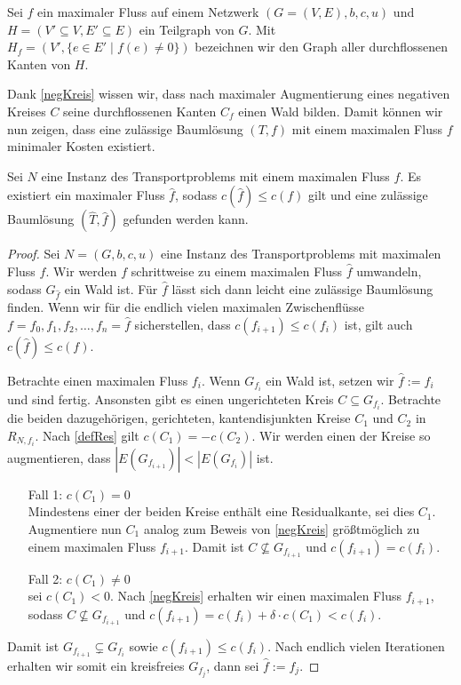 \begin{nota}Sei $f$ ein maximaler Fluss auf einem Netzwerk $(G=(V,E),b,c,u)$ und $H=(V'\subseteq V, E'\subseteq E)$ ein Teilgraph von $G$. Mit $H_f=(V',\{e\in E' \mid f(e) \neq 0\})$ bezeichnen wir den Graph aller durchflossenen Kanten von $H$.\end{nota}

Dank \cref{negKreis} wissen wir, dass nach maximaler Augmentierung eines negativen Kreises $C$ seine durchflossenen Kanten $C_f$ einen Wald bilden. Damit können wir nun zeigen, dass eine zulässige Baumlösung $(T,f)$ mit einem maximalen Fluss $f$ minimaler Kosten existiert.

\begin{thm}\label{BLex}Sei $N$ eine Instanz des Transportproblems mit einem maximalen Fluss $f$. Es existiert ein maximaler Fluss $\hat{f}$, sodass $c(\hat{f})\leq c(f)$ gilt und eine zulässige Baumlösung $(\hat{T},\hat{f})$ gefunden werden kann.\end{thm}
\begin{proof}Sei $N=(G,b,c,u)$ eine Instanz des Transportproblems mit maximalen Fluss $f$. Wir werden $f$ schrittweise zu einem maximalen Fluss $\hat{f}$ umwandeln, sodass $G_{\hat{f}}$ ein Wald ist. Für $\hat{f}$ lässt sich dann leicht eine zulässige Baumlösung finden. Wenn wir für die endlich vielen maximalen Zwischenflüsse $f=f_0,f_1,f_2,\ldots,f_n=\hat{f}$ sicherstellen, dass $c(f_{i+1})\leq c(f_i)$ ist, gilt auch $c(\hat{f})\leq c(f)$.

Betrachte einen maximalen Fluss $f_i$. Wenn $G_{f_i}$ ein Wald ist, setzen wir $\hat{f}:=f_i$ und sind fertig. Ansonsten gibt es einen ungerichteten Kreis $C\subseteq G_{f_i}$. Betrachte die beiden dazugehörigen, gerichteten, kantendisjunkten Kreise $C_1$ und $C_2$ in $R_{N,f_i}$. Nach \cref{defRes} gilt $c(C_1)=-c(C_2)$. Wir werden einen der Kreise so augmentieren, dass $|E(G_{f_{i+1}})|<|E(G_{f_i})|$ ist.
\begin{itemize}[leftmargin=!,labelwidth=]
\item[Fall 1:] $c(C_1)=0$\\
	Mindestens einer der beiden Kreise enthält eine Residualkante, sei dies \obda $C_1$. Augmentiere nun $C_1$ analog zum Beweis von \cref{negKreis} größtmöglich zu einem maximalen Fluss $f_{i+1}$. Damit ist $C\nsubseteq G_{f_{i+1}}$ und $c(f_{i+1}) = c(f_i)$.
\item[Fall 2:] $c(C_1)\neq0$\\
	\Obda sei $c(C_1)<0$. Nach \cref{negKreis} erhalten wir einen maximalen Fluss $f_{i+1}$, sodass $C\nsubseteq G_{f_{i+1}}$ und $c(f_{i+1}) = c(f_i) + \delta\cdot c(C_1)<c(f_i)$.
\end{itemize}

Damit ist $G_{f_{i+1}}\subsetneq G_{f_i}$ sowie $c(f_{i+1})\leq c(f_i)$. Nach endlich vielen Iterationen erhalten wir somit ein kreisfreies $G_{f_j}$, dann sei $\hat{f}:=f_j$.
\end{proof}

